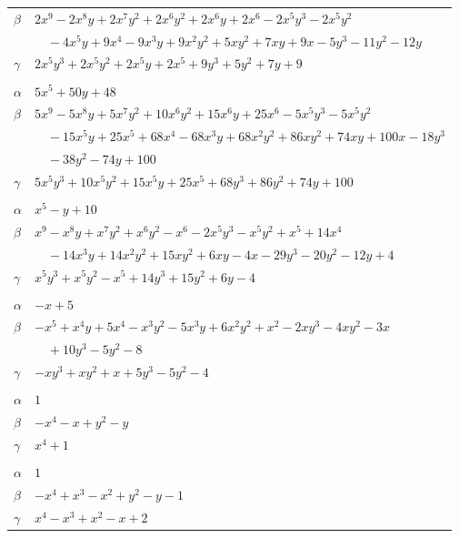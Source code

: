 \documentclass[11pt]{article}
\begin{document}
\begin{longtable}{@{}ll@{}}
$\beta$ & $2x^{9}-2x^{8}y+2x^{7}y^{2}+2x^{6}y^{2}+2x^{6}y+2x^{6}-2x^{5}y^{3}-2x^{5}y^{2}$\\
 & $\quad -4x^{5}y+9x^{4}-9x^{3}y+9x^{2}y^{2}+5xy^{2}+7xy+9x-5y^{3}-11y^{2}-12y$\\
$\gamma$ & $2x^{5}y^{3}+2x^{5}y^{2}+2x^{5}y+2x^{5}+9y^{3}+5y^{2}+7y+9$\\
\addlinespace[3pt]
\multicolumn{2}{@{}l}{$\{i,j\}=\{3,24\}$, $k_{ij}=2^{6}\cdot 3$}\\
$\alpha$ & $5x^{5}+50y+48$\\
$\beta$ & $5x^{9}-5x^{8}y+5x^{7}y^{2}+10x^{6}y^{2}+15x^{6}y+25x^{6}-5x^{5}y^{3}-5x^{5}y^{2}$\\
 & $\quad -15x^{5}y+25x^{5}+68x^{4}-68x^{3}y+68x^{2}y^{2}+86xy^{2}+74xy+100x-18y^{3}$\\
 & $\quad -38y^{2}-74y+100$\\
$\gamma$ & $5x^{5}y^{3}+10x^{5}y^{2}+15x^{5}y+25x^{5}+68y^{3}+86y^{2}+74y+100$\\
\addlinespace[3pt]
\multicolumn{2}{@{}l}{$\{i,j\}=\{3,33\}$, $k_{ij}=2^{3}\cdot 5$}\\
$\alpha$ & $x^{5}-y+10$\\
$\beta$ & $x^{9}-x^{8}y+x^{7}y^{2}+x^{6}y^{2}-x^{6}-2x^{5}y^{3}-x^{5}y^{2}+x^{5}+14x^{4}$\\
 & $\quad -14x^{3}y+14x^{2}y^{2}+15xy^{2}+6xy-4x-29y^{3}-20y^{2}-12y+4$\\
$\gamma$ & $x^{5}y^{3}+x^{5}y^{2}-x^{5}+14y^{3}+15y^{2}+6y-4$\\
\addlinespace[3pt]
\multicolumn{2}{@{}l}{$\{i,j\}=\{3,34\}$, $k_{ij}=2^{2}\cdot 5$}\\
$\alpha$ & $-x+5$\\
$\beta$ & $-x^{5}+x^{4}y+5x^{4}-x^{3}y^{2}-5x^{3}y+6x^{2}y^{2}+x^{2}-2xy^{3}-4xy^{2}-3x$\\
 & $\quad +10y^{3}-5y^{2}-8$\\
$\gamma$ & $-xy^{3}+xy^{2}+x+5y^{3}-5y^{2}-4$\\
\addlinespace[3pt]
\multicolumn{2}{@{}l}{$\{i,j\}=\{4,8\}$, $k_{ij}=3$}\\
$\alpha$ & $1$\\
$\beta$ & $-x^{4}-x+y^{2}-y$\\
$\gamma$ & $x^{4}+1$\\
\addlinespace[3pt]
\multicolumn{2}{@{}l}{$\{i,j\}=\{4,14\}$, $k_{ij}=1$}\\
$\alpha$ & $1$\\
$\beta$ & $-x^{4}+x^{3}-x^{2}+y^{2}-y-1$\\
$\gamma$ & $x^{4}-x^{3}+x^{2}-x+2$\\

\end{longtable}
\end{document}
